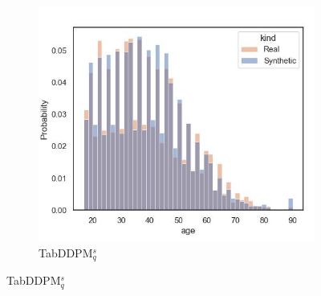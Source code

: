 \begin{figure}[H]
\begin{subfigure}{0.3\textwidth}
		\centering
		\includegraphics[width=\textwidth]{images/dist_age/tab-ddpm-simTune.jpg}
		\caption{TabDDPM$^{s}_q$}
	\end{subfigure}



\end{figure}
